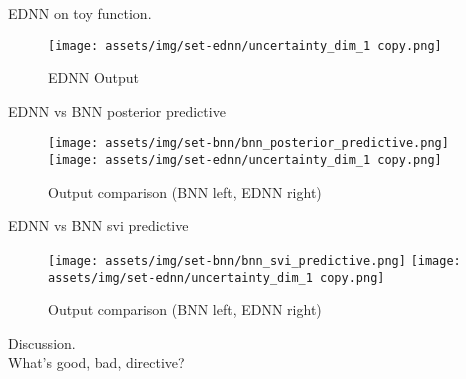 \documentclass[10pt]{beamer}
\begin{document}
\begin{frame}{EDNN on toy function.}
  \begin{figure}
    \centering
    \texttt{[image: assets/img/set-ednn/uncertainty\_dim\_1 copy.png]}
    \caption{EDNN Output}
  \end{figure}
\end{frame}


\begin{frame}{EDNN vs BNN posterior predictive}
  \begin{figure}
    \centering
    \texttt{[image: assets/img/set-bnn/bnn\_posterior\_predictive.png]}
    \texttt{[image: assets/img/set-ednn/uncertainty\_dim\_1 copy.png]}
    \caption{Output comparison (BNN left, EDNN right)}
  \end{figure}
\end{frame}


\begin{frame}{EDNN vs BNN svi predictive}
  \begin{figure}
    \centering
    \texttt{[image: assets/img/set-bnn/bnn\_svi\_predictive.png]}
    \texttt{[image: assets/img/set-ednn/uncertainty\_dim\_1 copy.png]}
    \caption{Output comparison (BNN left, EDNN right)}
  \end{figure}
\end{frame}

\begin{frame}[standout]
  Discussion. \\
  What's good, bad, directive? \\
\end{frame}
\end{document}
